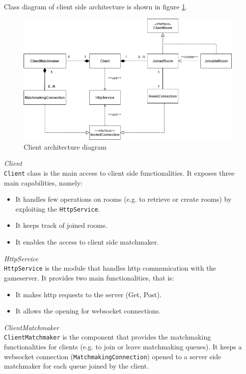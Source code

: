 Class diagram of client side architecture is shown in figure \ref{fig:client_architecture}. 
\begin{figure}[H]
	\centering
	\includegraphics[scale=0.65]{images/3-architecture/client-architecture.png}
	\caption{Client architecture diagram}
	\label{fig:client_architecture}
\end{figure}
\bigskip
\textit{Client}
\\
\texttt{Client} class is the main access to client side functionalities.
It exposes three main capabilities, namely:
\begin{itemize}
  \item It handles few operations on rooms (e.g. to retrieve or create rooms) by exploiting the \texttt{HttpService}.
  \item It keeps track of joined rooms.
  \item It enables the access to client side matchmaker.
\end{itemize}

\bigskip
\textit{HttpService}
\\
\texttt{HttpService} is the module that handles http communication with the gameserver. It provides two main functionalities, that is:
\begin{itemize}
  \item It makes http requests to the server (Get, Post).
  \item It allows the opening for websocket connections.
\end{itemize}

\bigskip
\textit{ClientMatchmaker}
\\
 \texttt{ClientMatchmaker} is the component that provides the matchmaking functionalities for clients (e.g. to join or leave matchmaking queues). It keeps a websocket connection (\texttt{MatchmakingConnection}) opened to a server side matchmaker for each queue joined by the client.

